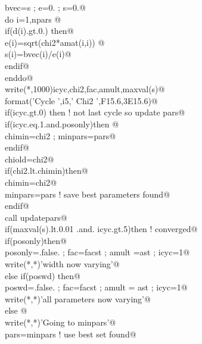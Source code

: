 \documentclass[10pt,a4paper,notitlepage]{article}
\begin{document}
\begin{flushleft}
\begin{list}{}{}
\mbox{}\verb@      bvec=s ; e=0. ; s=0.@\\
\mbox{}\verb@      do i=1,npars @\\
\mbox{}\verb@        if(d(i).gt.0.) then@\\
\mbox{}\verb@         e(i)=sqrt(chi2*amat(i,i)) @\\
\mbox{}\verb@         s(i)=bvec(i)/e(i)@\\
\mbox{}\verb@        endif@\\
\mbox{}\verb@      enddo@\\
\mbox{}\verb@      write(*,1000)icyc,chi2,fac,amult,maxval(s)@\\
\mbox{}  format('Cycle ',i5,' Chi2 ',F15.6,3E15.6)@\\
\mbox{}\verb@      if(icyc.gt.0) then ! not last cycle so update pars@\\
\mbox{}\verb@         if(icyc.eq.1.and.posonly)then @\\
\mbox{}\verb@           chimin=chi2 ; minpars=pars@\\
\mbox{}\verb@         endif@\\
\mbox{}\verb@         chiold=chi2@\\
\mbox{}\verb@         if(chi2.lt.chimin)then@\\
\mbox{}\verb@           chimin=chi2@\\
\mbox{}\verb@           minpars=pars ! save best parameters found@\\
\mbox{}\verb@         endif@\\
\mbox{}\verb@         call updatepars@\\
\mbox{}\verb@         if(maxval(s).lt.0.01 .and. icyc.gt.5)then ! converged@\\
\mbox{}\verb@           if(posonly)then@\\
\mbox{}\verb@             posonly=.false. ; fac=facst ; amult =ast ; icyc=1@\\
\mbox{}\verb@             write(*,*)'width now varying'@\\
\mbox{}\verb@           else if(poswd) then@\\
\mbox{}\verb@             poswd=.false. ; fac=facst ; amult = ast ; icyc=1@\\
\mbox{}\verb@             write(*,*)'all parameters now varying'@\\
\mbox{}\verb@           else @\\
\mbox{}\verb@             write(*,*)'Going to minpars'@\\
\mbox{}\verb@             pars=minpars ! use best set found@\\

\end{list}
\end{flushleft}
\end{document}
